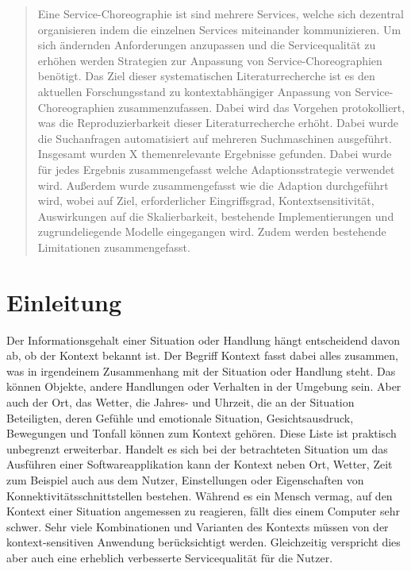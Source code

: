 \documentclass[conference,compsoc]{IEEEtran}
\begin{document}
\begin{abstract}
Eine Service-Choreographie ist sind mehrere Services, welche sich dezentral organisieren indem die einzelnen Services miteinander kommunizieren. Um sich ändernden Anforderungen anzupassen und die Servicequalität zu erhöhen werden Strategien zur Anpassung von Service-Choreographien benötigt.
Das Ziel dieser systematischen Literaturrecherche ist es den aktuellen Forschungsstand zu kontextabhängiger Anpassung von Service-Choreographien zusammenzufassen. Dabei wird das Vorgehen protokolliert, was die Reproduzierbarkeit dieser Literaturrecherche erhöht. Dabei wurde die Suchanfragen automatisiert auf mehreren Suchmaschinen ausgeführt. Insgesamt wurden X %
themenrelevante Ergebnisse gefunden. Dabei wurde für jedes Ergebnis zusammengefasst welche Adaptionsstrategie verwendet wird. Außerdem wurde zusammengefasst wie die Adaption durchgeführt wird, wobei auf Ziel, erforderlicher Eingriffsgrad, Kontextsensitivität, Auswirkungen auf die Skalierbarkeit, bestehende Implementierungen und zugrundeliegende Modelle eingegangen wird. Zudem werden bestehende Limitationen zusammengefasst.
\end{abstract}





%
\IEEEpeerreviewmaketitle



\section{Einleitung}
Der Informationsgehalt einer Situation oder Handlung hängt entscheidend davon ab, ob der Kontext bekannt ist. Der Begriff Kontext fasst dabei alles zusammen, was in irgendeinem Zusammenhang mit der Situation oder Handlung steht. Das können Objekte, andere Handlungen oder Verhalten in der Umgebung sein. Aber auch der Ort, das Wetter, die Jahres- und Uhrzeit, die an der Situation Beteiligten, deren Gefühle und emotionale Situation, Gesichtsausdruck, Bewegungen und Tonfall können zum Kontext gehören. Diese Liste ist praktisch unbegrenzt erweiterbar. Handelt es sich bei der betrachteten Situation um das Ausführen einer Softwareapplikation kann der Kontext neben Ort, Wetter, Zeit zum Beispiel auch aus dem Nutzer, Einstellungen oder Eigenschaften von Konnektivitätsschnittstellen bestehen. Während es ein Mensch vermag, auf den Kontext einer Situation angemessen zu reagieren, fällt dies einem Computer sehr schwer. Sehr viele Kombinationen und Varianten des Kontexts müssen von der kontext-sensitiven Anwendung berücksichtigt werden. Gleichzeitig verspricht dies aber auch eine erheblich verbesserte Servicequalität für die Nutzer.
\end{document}
